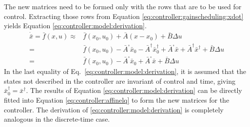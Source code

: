     The new matrices need to be formed only with the rows that are to be used
    for control. Extracting those rows from Equation \eqref{eq:controller:gainscheduling:xdot}
    yields Equation \eqref{eq:controller:model:derivation}.
    \begin{equation}
        \label{eq:controller:model:derivation}
        \begin{array}{rl}
             \dot{\bar{x}} = \bar{f}(x,u) \approx & \bar{f}(x_{0},u_{0}) + \bar{A}(x - x_{0}) + \bar{B}\Delta u \\
             = & \bar{f}(x_{0},u_{0}) - \bar{A}^{\square}\bar{x}_{0} - \bar{A}^{\dagger}\bar{x}^{\dagger}_{0} + \bar{A}^{\square}\bar{x} + \bar{A}^{\dagger}\bar{x}^{\dagger} + \bar{B}\Delta u \\
             = & \bar{f}(x_{0},u_{0}) - \bar{A}^{\square}\bar{x}_{0} + \bar{A}^{\square}\bar{x} + \bar{B}\Delta u
        \end{array}
    \end{equation}
    In the last equality of Eq.~\eqref{eq:controller:model:derivation}, it
    is assumed that the states not described in the controller are invariant
    of control and time, giving $\bar{x}^{\dagger}_{0} = \bar{x}^{\dagger}$.
    The results of Equation \eqref{eq:controller:model:derivation} can be
    directly fitted into Equation \eqref{eq:controller:affinelq} to form
    the new matrices for the controller.
    The derivation of \eqref{eq:controller:model:derivation} is
    completely analogous in the discrete-time case.
